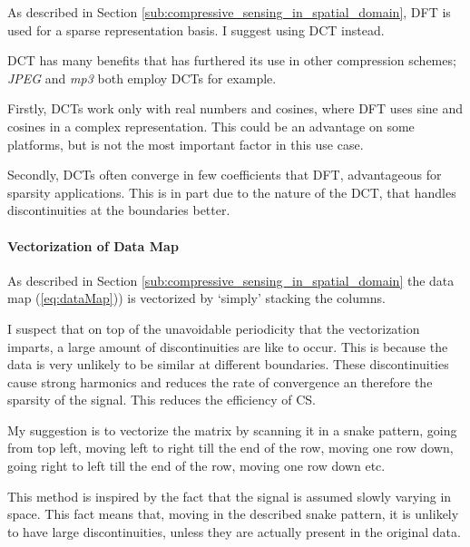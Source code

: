\documentclass[Main]{subfiles}
\begin{document}
				As described in Section \ref{sub:compressive_sensing_in_spatial_domain}, DFT is used for a sparse representation basis.
				I suggest using DCT instead.

				DCT has many benefits that has furthered its use in other compression schemes; \emph{JPEG} and \emph{mp3} both employ DCTs for example.

				Firstly, DCTs work only with real numbers and cosines, where DFT uses sine and cosines in a complex representation. This could be an advantage on some platforms, but is not the most important factor in this use case.

				Secondly, DCTs often converge in few coefficients that DFT, advantageous for sparsity applications.
				This is in part due to the nature of the DCT, that handles discontinuities at the boundaries better.


			\paragraph{Vectorization of Data Map} %
			\label{par:vectorization_of_data_map}

				As described in Section \ref{sub:compressive_sensing_in_spatial_domain} the data map (\ref{eq:dataMap})) is vectorized by `simply' stacking the columns.

				I suspect that on top of the unavoidable periodicity that the vectorization imparts, a large amount of discontinuities are like to occur.
				This is because the data is very unlikely to be similar at different boundaries.
				These discontinuities cause strong harmonics and reduces the rate of convergence an therefore the sparsity of the signal.
				This reduces the efficiency of CS.

				My suggestion is to vectorize the matrix by scanning it in a snake pattern, going from top left, moving left to right till the end of the row, moving one row down, going right to left till the end of the row, moving one row down etc.

				This method is inspired by the fact that the signal is assumed slowly varying in space.
				This fact means that, moving in the described snake pattern, it is unlikely to have large discontinuities, unless they are actually present in the original data.

		


\end{document}
